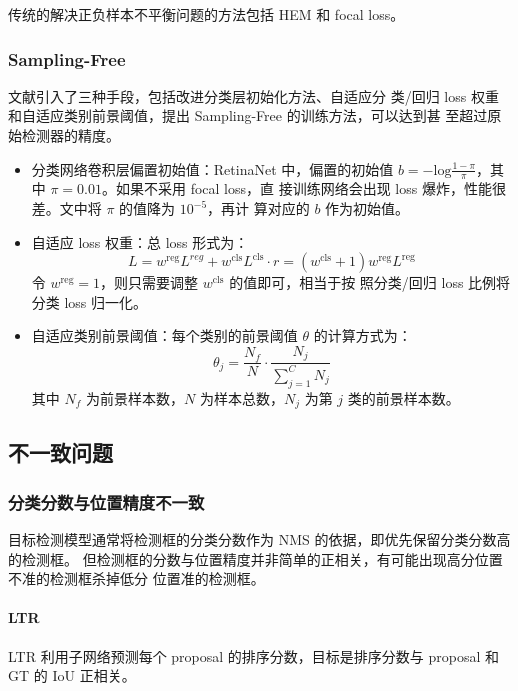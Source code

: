 传统的解决正负样本不平衡问题的方法包括 HEM 和 focal loss。

\subsubsection{Sampling-Free}
文献引入了三种手段，包括改进分类层初始化方法、自适应分
类/回归 loss 权重和自适应类别前景阈值，提出 Sampling-Free 的训练方法，可以达到甚
至超过原始检测器的精度。

\begin{itemize}
  \item 分类网络卷积层偏置初始值：RetinaNet 中，偏置的初始值 $b =
    -\mathrm{log}\frac{1-\pi}{\pi}$，其中 $\pi=0.01$。如果不采用 focal loss，直
    接训练网络会出现 loss 爆炸，性能很差。文中将 $\pi$ 的值降为 $10^{-5}$，再计
    算对应的 $b$ 作为初始值。
  \item 自适应 loss 权重：总 loss 形式为：
    \begin{equation}
    L = w^{\mathrm{reg}} L^{reg} +
    w^{\mathrm{cls}} L^{\mathrm{cls}} \cdot r = \left( w^{\mathrm{cls}} + 1
    \right) w^{\mathrm{reg}} L^{\mathrm{reg}}
    \end{equation}
    令 $w^{\mathrm{reg}} = 1$，则只需要调整 $w^{\mathrm{cls}}$ 的值即可，相当于按
    照分类/回归 loss 比例将分类 loss 归一化。
  \item 自适应类别前景阈值：每个类别的前景阈值 $\theta$ 的计算方式为：
    \begin{equation}
      \theta_j = \frac{N_f}{N} \cdot \frac{N_j}{\sum_{j=1}^{C} N_j}
    \end{equation}
    其中 $N_f$ 为前景样本数，$N$ 为样本总数，$N_j$ 为第 $j$ 类的前景样本数。
\end{itemize}

\subsection{不一致问题}
\subsubsection{分类分数与位置精度不一致}
目标检测模型通常将检测框的分类分数作为 NMS 的依据，即优先保留分类分数高的检测框。
但检测框的分数与位置精度并非简单的正相关，有可能出现高分位置不准的检测框杀掉低分
位置准的检测框。

\paragraph{LTR}
LTR 利用子网络预测每个 proposal 的排序分数，目标是排序分数与 proposal 和 GT 的
IoU 正相关。

